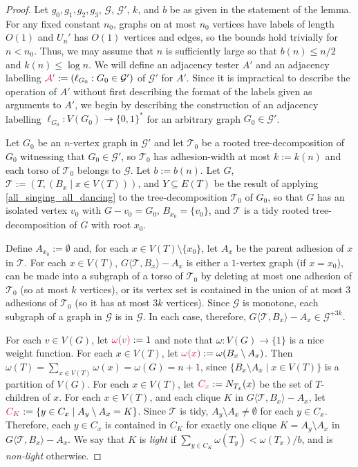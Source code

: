 \documentclass{patmorin}
\makeatletter
\renewcommand{\le}{\leqslant}
\newcommand{\defin}[1]{\emph{\textcolor{brightmaroon}{#1}}}
\def\mathcolor#1#{\@mathcolor{#1}}
\def\@mathcolor#1#2#3{%
  \protect\leavevmode
  \begingroup
    \color#1{#2}#3%
  \endgroup
}
\newcommand{\mathdefin}[1]{\mathcolor{brightmaroon}{#1}}
\newcommand{\torso}[2]{{#1}\langle{#2}\rangle}
\newcommand{\Oh}{O}
\newcommand{\calA}{\mathcal{A}}
\newcommand{\calG}{\mathcal{G}}
\newcommand{\calT}{\mathcal{T}}
\makeatother
\begin{document}
\begin{proof}
  Let $g_0,g_1,g_2,g_3$, $\calG$, $\calG'$, $k$, and $b$ be as given in the statement of the lemma. For any fixed constant $n_0$, graphs on at most $n_0$ vertices have labels of length $\Oh(1)$ and $U_n'$ has $\Oh(1)$ vertices and edges, so the bounds hold trivially for $n < n_0$. Thus, we may assume that $n$ is sufficiently large so that $b(n)\le n/2$ and $k(n)\le \log n$.
  We will define an adjacency tester $A'$ and an adjacency labelling $\mathdefin{\calA'}:=(\ell_{G_0}:G_0\in\calG')$ of $\calG'$ for $A'$.  Since it is impractical to describe the operation of $A'$ without first describing the format of the labels given as arguments to $A'$, we begin by describing the construction of an adjacency labelling $\ell_{G_0}:V(G_0)\to\{0,1\}^*$ for an arbitrary graph $G_0\in\calG'$.

  Let $G_0$ be an $n$-vertex graph in $\calG'$ and let $\calT_0$ be a rooted tree-decomposition of $G_0$ witnessing that $G_0\in\calG'$, so $\calT_0$ has adhesion-width at most $k:=k(n)$ and each torso of $\calT_0$ belongs to $\calG$. Let $b:=b(n)$.  Let $G$, $\calT:=(T,(B_x\mid x\in V(T)))$, and $Y\subseteq E(T)$ be the result of applying \cref{all_singing_all_dancing} to the tree-decomposition $\calT_0$ of $G_0$, so that $G$ has an isolated vertex $v_0$ with $G-v_0=G_0$, $B_{x_0}=\{v_0\}$, and $\calT$ is a tidy rooted tree-decomposition of $G$ with root $x_0$.  
  
  Define $A_{x_0}:=\emptyset$ and, for each $x\in V(T)\setminus\{x_0\}$, let $A_x$ be the parent adhesion of $x$ in $\calT$.  For each $x\in V(T)$, $\torso{G}{\calT,B_x}-A_x$ is either a $1$-vertex graph (if $x=x_0$), can be made into a subgraph of a torso of $\calT_0$ by deleting at most one adhesion of $\calT_0$ (so at most $k$ vertices), or its vertex set is contained in the union of at most $3$ adhesions of $\calT_0$ (so it has at most $3k$ vertices). Since $\calG$ is monotone, each subgraph of a graph in $\calG$ is in $\calG$. In each case, therefore, $\torso{G}{\calT,B_x}-A_x\in\calG^{+3k}$.
  

  For each $v\in V(G)$, let $\mathdefin{\omega(v)}:=1$ and note that $\omega:V(G)\to\{1\}$ is a nice weight function. For each $x\in V(T)$, let $\mathdefin{\omega(x)}:=\omega(B_x\setminus A_x)$. Then $\omega(T)=\sum_{x\in V(T)}\omega(x)=\omega(G)=n+1$, since $\{B_x\setminus A_x\mid x\in V(T)\}$ is a partition of $V(G)$.  For each $x\in V(T)$, let $\mathdefin{C_x}:=N_{T_x}(x)$ be the set of $T$-children of $x$. For each $x\in V(T)$, and each clique $K$ in $\torso{G}{\calT,B_x}-A_x$, let $\mathdefin{C_K}:=\{y\in C_x\mid A_y\setminus A_x=K\}$.  Since $\calT$ is tidy, $A_y\setminus A_x\neq\emptyset$ for each $y\in C_x$.  Therefore, each $y\in C_x$ is contained in $C_K$ for exactly one clique $K=A_y\setminus A_x$ in $\torso{G}{\calT,B_x}-A_x$. We say that $K$ is \defin{light} if $\sum_{y\in C_K}\omega(T_y) < \omega(T_x)/b$, and is \defin{non-light} otherwise.
  


\end{proof}
\end{document}
